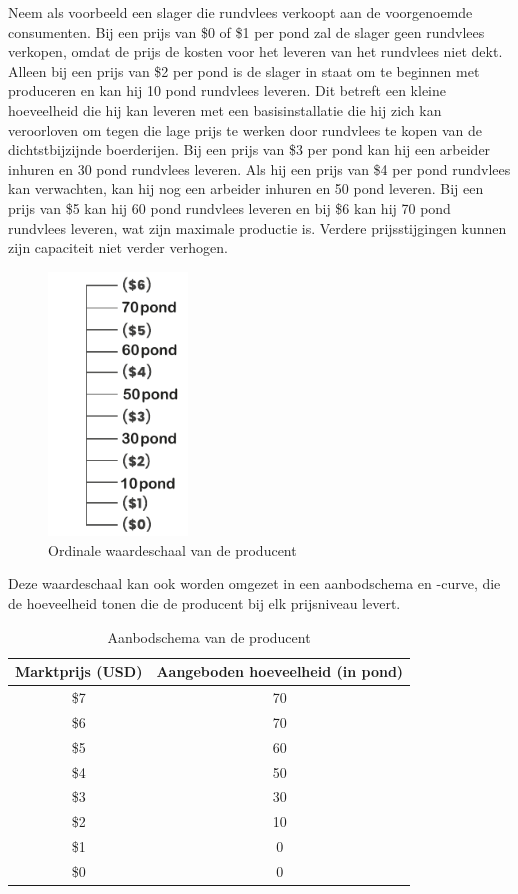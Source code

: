Neem als voorbeeld een slager die rundvlees verkoopt aan de voorgenoemde consumenten. Bij een prijs van \$0 of \$1 per pond zal de slager geen rundvlees verkopen, omdat de prijs de kosten voor het leveren van het rundvlees niet dekt. Alleen bij een prijs van \$2 per pond is de slager in staat om te beginnen met produceren en kan hij 10 pond rundvlees leveren. Dit betreft een kleine hoeveelheid die hij kan leveren met een basisinstallatie die hij zich kan veroorloven om tegen die lage prijs te werken door rundvlees te kopen van de dichtstbijzijnde boerderijen. Bij een prijs van \$3 per pond kan hij een arbeider inhuren en 30 pond rundvlees leveren. Als hij een prijs van \$4 per pond rundvlees kan verwachten, kan hij nog een arbeider inhuren en 50 pond leveren. Bij een prijs van \$5 kan hij 60 pond rundvlees leveren en bij \$6 kan hij 70 pond rundvlees leveren, wat zijn maximale productie is. Verdere prijsstijgingen kunnen zijn capaciteit niet verder verhogen.

\begin{figure}[H]
\centering
    \includegraphics[height=7cm]{figures/fig23.pdf}
    \caption[Ordinale waardeschaal van de producent]{Ordinale waardeschaal van de producent}
    \label{fig23}
\end{figure}

Deze waardeschaal kan ook worden omgezet in een aanbodschema en -curve, die de hoeveelheid tonen die de producent bij elk prijsniveau levert.

\begin{table}[H]
\centering
\begin{tabular}{|c|c|}  %
\hline  %
    \cellcolor{gray!25}Marktprijs (USD) &
    \cellcolor{gray!25}Aangeboden hoeveelheid (in pond) \\
\hline  %
 \$7 & 70 \\ \hline
 \$6 & 70 \\ \hline
 \$5 & 60 \\ \hline
 \$4 & 50 \\ \hline
 \$3 & 30 \\ \hline
 \$2 & 10 \\ \hline
 \$1 & 0  \\ \hline
 \$0 & 0  \\ \hline  %
\end{tabular}
\caption{Aanbodschema van de producent}
\label{tab5}
\end{table}

